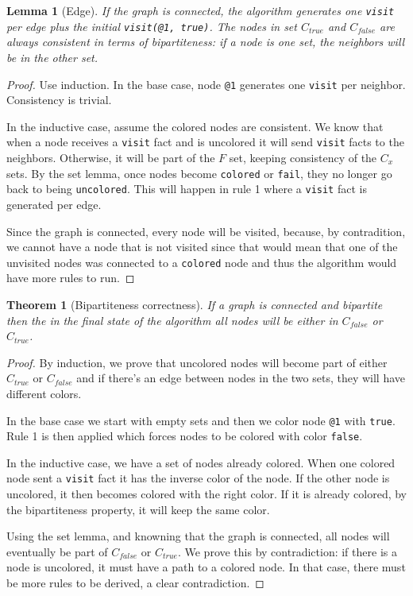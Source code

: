 \documentclass[9pt]{article}
\newtheorem{theorem}{Theorem}
\newtheorem{lemma}{Lemma}
\begin{document}
\begin{lemma}[Edge]
If the graph is connected, the algorithm generates one \texttt{visit} per edge plus the initial \texttt{visit(@1, true)}. The nodes in set $C_{true}$ and $C_{false}$ are always consistent in terms of bipartiteness: if a node is one set, the neighbors will be in the other set.
\end{lemma}
\begin{proof}
Use induction. In the base case, node \texttt{@1} generates one \texttt{visit} per neighbor. Consistency is trivial.

In the inductive case, assume the colored nodes are consistent. We know that when a node receives a \texttt{visit} fact and is uncolored it will send \texttt{visit} facts to the neighbors. Otherwise, it will be part of the $F$ set, keeping consistency of the $C_x$ sets.
By the set lemma, once nodes become \texttt{colored} or \texttt{fail}, they no longer go back to being \texttt{uncolored}. This will happen in rule 1 where a \texttt{visit} fact is generated per edge.

Since the graph is connected, every node will be visited, because, by contradition, we cannot have a node that is not visited since that would mean that one of the unvisited nodes was connected to a \texttt{colored} node and thus the algorithm would have more rules to run.
\end{proof}

\begin{theorem}[Bipartiteness correctness]
If a graph is connected and bipartite then the in the final state of the algorithm all nodes will be either in $C_{false}$ or $C_{true}$.
\end{theorem}
\begin{proof}
By induction, we prove that uncolored nodes will become part of either $C_{true}$ or $C_{false}$ and if there's an edge between nodes in the two sets, they will have different colors.

In the base case we start with empty sets and then we color node \texttt{@1} with \texttt{true}. Rule 1 is then applied which forces nodes to be colored with color \texttt{false}.

In the inductive case, we have a set of nodes already colored. When one colored node sent a \texttt{visit} fact it has the inverse color of the node. If the other node is uncolored, it then becomes colored with the right color. If it is already colored, by the bipartiteness property, it will keep the same color.

Using the set lemma, and knowning that the graph is connected, all nodes will eventually be part of $C_{false}$ or $C_{true}$. We prove this by contradiction: if there is a node is uncolored, it must have a path to a colored node. In that case, there must be more rules to be derived, a clear contradiction.
\end{proof}
\end{document}
